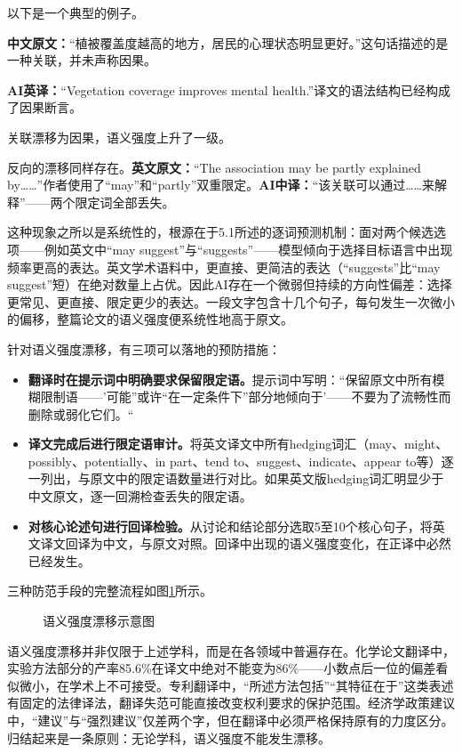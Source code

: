 以下是一个典型的例子。

\textbf{中文原文：}``植被覆盖度越高的地方，居民的心理状态明显更好。''这句话描述的是一种关联，并未声称因果。

\textbf{AI英译：}``Vegetation coverage improves mental health.''译文的语法结构已经构成了因果断言。

关联漂移为因果，语义强度上升了一级。

反向的漂移同样存在。\textbf{英文原文：}``The association may be partly explained by……''作者使用了``may''和``partly''双重限定。\textbf{AI中译：}``该关联可以通过……来解释''——两个限定词全部丢失。

这种现象之所以是系统性的，根源在于5.1所述的逐词预测机制：面对两个候选选项——例如英文中``may suggest''与``suggests''——模型倾向于选择目标语言中出现频率更高的表达。英文学术语料中，更直接、更简洁的表达（``suggests''比``may suggest''短）在绝对数量上占优。因此AI存在一个微弱但持续的方向性偏差：选择更常见、更直接、限定更少的表达。一段文字包含十几个句子，每句发生一次微小的偏移，整篇论文的语义强度便系统性地高于原文。

针对语义强度漂移，有三项可以落地的预防措施：

\begin{itemize}
\setlength{\itemsep}{4pt}
\item \textbf{翻译时在提示词中明确要求保留限定语。}提示词中写明：``保留原文中所有模糊限制语——'可能''或许``在一定条件下''部分地倾向于'——不要为了流畅性而删除或弱化它们。``
\item \textbf{译文完成后进行限定语审计。}将英文译文中所有hedging词汇（may、might、possibly、potentially、in part、tend to、suggest、indicate、appear to等）逐一列出，与原文中的限定语数量进行对比。如果英文版hedging词汇明显少于中文原文，逐一回溯检查丢失的限定语。
\item \textbf{对核心论述句进行回译检验。}从讨论和结论部分选取5至10个核心句子，将英文译文回译为中文，与原文对照。回译中出现的语义强度变化，在正译中必然已经发生。
\end{itemize}

三种防范手段的完整流程如图\ref{fig:ch5_07}所示。

\begin{figure}[H]
\centering
{}
\caption{语义强度漂移示意图}
\label{fig:ch5_07}
\end{figure}
\par

\medskip
语义强度漂移并非仅限于上述学科，而是在各领域中普遍存在。化学论文翻译中，实验方法部分的产率85.6\%在译文中绝对不能变为86\%——小数点后一位的偏差看似微小，在学术上不可接受。专利翻译中，``所述方法包括''``其特征在于''这类表述有固定的法律译法，翻译失范可能直接改变权利要求的保护范围。经济学政策建议中，``建议''与``强烈建议''仅差两个字，但在翻译中必须严格保持原有的力度区分。归结起来是一条原则：无论学科，语义强度不能发生漂移。

